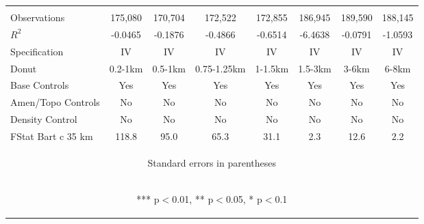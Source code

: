 \begin{tabular}{lccccccc}
\vspace{4pt} & \begin{footnotesize}\end{footnotesize} & \begin{footnotesize}\end{footnotesize} & \begin{footnotesize}\end{footnotesize} & \begin{footnotesize}\end{footnotesize} & \begin{footnotesize}\end{footnotesize} & \begin{footnotesize}\end{footnotesize} & \begin{footnotesize}\end{footnotesize} \\
Observations & 175,080 & 170,704 & 172,522 & 172,855 & 186,945 & 189,590 & 188,145 \\
$R^2$ & -0.0465 & -0.1876 & -0.4866 & -0.6514 & -6.4638 & -0.0791 & -1.0593 \\
Specification & IV & IV & IV & IV & IV & IV & IV \\
Donut & 0.2-1km & 0.5-1km & 0.75-1.25km & 1-1.5km & 1.5-3km & 3-6km & 6-8km \\
Base Controls & Yes & Yes & Yes & Yes & Yes & Yes & Yes \\
Amen/Topo Controls & No & No & No & No & No & No & No \\
Density Control & No & No & No & No & No & No & No \\
 FStat Bart c 35 km & 118.8 & 95.0 & 65.3 & 31.1 & 2.3 & 12.6 & 2.2 \\ \hline
\multicolumn{8}{c}{\begin{footnotesize} Standard errors in parentheses\end{footnotesize}} \\
\multicolumn{8}{c}{\begin{footnotesize} *** p$<$0.01, ** p$<$0.05, * p$<$0.1\end{footnotesize}} \\
\end{tabular}


